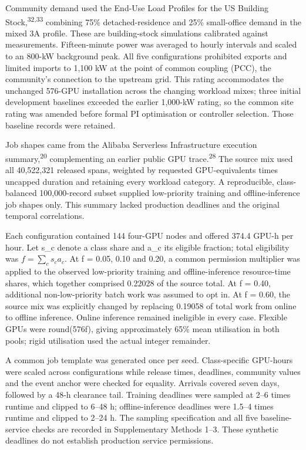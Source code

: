 \documentclass[10pt,a4paper]{article}
\begin{document}
Community demand used the End-Use Load Profiles for the US Building Stock,\textsuperscript{32,33} combining 75\% detached-residence and 25\% small-office demand in the mixed 3A profile. These are building-stock simulations calibrated against measurements. Fifteen-minute power was averaged to hourly intervals and scaled to an 800-kW background peak. All five configurations prohibited exports and limited imports to 1,100 kW at the point of common coupling (PCC), the community's connection to the upstream grid. This rating accommodates the unchanged 576-GPU installation across the changing workload mixes; three initial development baselines exceeded the earlier 1,000-kW rating, so the common site rating was amended before formal PI optimisation or controller selection. Those baseline records were retained.


Job shapes came from the Alibaba Serverless Infrastructure execution summary,\textsuperscript{20} complementing an earlier public GPU trace.\textsuperscript{28} The source mix used all 40,522,321 released spans, weighted by requested GPU-equivalents times uncapped duration and retaining every workload category. A reproducible, class-balanced 100,000-record subset supplied low-priority training and offline-inference job shapes only. This summary lacked production deadlines and the original temporal correlations.


Each configuration contained 144 four-GPU nodes and offered 374.4 GPU-h per hour. Let s\_c denote a class share and a\_c its eligible fraction; total eligibility was \(f = \sum_c s_c a_c\). At f = 0.05, 0.10 and 0.20, a common permission multiplier was applied to the observed low-priority training and offline-inference resource-time shares, which together comprised 0.22028 of the source total. At f = 0.40, additional non-low-priority batch work was assumed to opt in. At f = 0.60, the source mix was explicitly changed by replacing 0.19058 of total work from online to offline inference. Online inference remained ineligible in every case. Flexible GPUs were round(576f), giving approximately 65\% mean utilisation in both pools; rigid utilisation used the actual integer remainder.


A common job template was generated once per seed. Class-specific GPU-hours were scaled across configurations while release times, deadlines, community values and the event anchor were checked for equality. Arrivals covered seven days, followed by a 48-h clearance tail. Training deadlines were sampled at 2–6 times runtime and clipped to 6–48 h; offline-inference deadlines were 1.5–4 times runtime and clipped to 2–24 h. The sampling specification and all five baseline-service checks are recorded in Supplementary Methods 1–3. These synthetic deadlines do not establish production service permissions.
\end{document}
